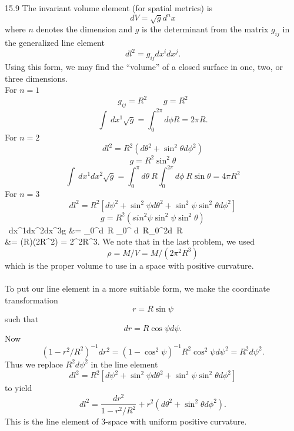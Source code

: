 \documentclass[10pt,letterpaper]{article}
\begin{document}
\item[15.9]
The invariant volume element (for spatial metrics) is
\[
	dV = \sqrt{g} d^n x
\]
where $n$ denotes the dimension and $g$ is the determinant from the matrix $g_{ij}$ in the generalized line element
\[
	dl^2 = g_{ij} dx^i dx^j.
\]
Using this form, we may find the ``volume'' of a closed surface in one, two, or three dimensions. \\For $n=1$
\[
	g_{ij} = R^2 \qquad g = R^2
\]
\[
	\int\ dx^1\sqrt g = \int_0^{2\pi} d\phi R = 2\pi R.
\]
For $n=2$
\[
	dl^2 = R^2(d\theta^2 + \sin^2\theta d\phi^2)
\]
\[
	g = R^2\sin^2\theta
\]
\[
		\int\ dx^1dx^2\sqrt g = \int_0^\pi d\theta\ R \int_0^{2\pi} d\phi\ R\sin\theta= 4\pi R^2
\]
For $n=3$
\[
	dl^2 = R^2[ d\psi^2+\sin^2\psi d\theta^2 + \sin^2\psi\sin^2\theta d\phi^2]
\]
\[
	g = R^2(sin^2\psi\sin^2\psi\sin^2\theta)
\]
\ba
		\int\ dx^1dx^2dx^3\sqrt g &= \int_0^\pi d\psi\ R \int_0^{\pi} d\phi\ R\sin\theta \int_0^{2\pi}d\psi\ R\sin\psi\sin\theta\\
		&= (R\pi)(2\pi R^2) = 2\pi^2R^3.
\ea
We note that in the last problem, we used
\[
	\rho = M/V = M/(2\pi^2 R^3)
\]
which is the proper volume to use in a space with positive curvature. \\ 
\\
To put our line element in a more suitiable form, we make the coordinate transformation
\[
	r = R\sin\psi
\]
such that
\[
	dr = R\cos\psi d\psi.
\]
Now
\[
	(1-r^2/R^2)^{-1} dr^2 = (1-\cos^2\psi)^{-1} R^2\cos^2\psi d\psi^2 = R^2 d\psi^2.
\]
Thus we replace $R^2d\psi^2$ in the line element
\[
	dl^2 = R^2[ d\psi^2+\sin^2\psi d\theta^2 + \sin^2\psi\sin^2\theta d\phi^2]
\]
to yield
\[
	dl^2 = \frac{dr^2}{1-r^2/R^2}+r^2(d\theta^2+\sin^2\theta d\phi^2).
\]
This is the line element of 3-space with uniform positive curvature. 
\eenum
\end{document}
